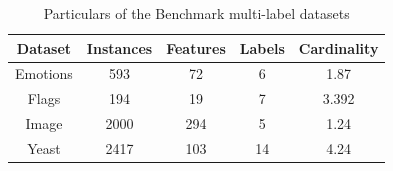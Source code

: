 \documentclass[12pt,a4paper,oneside,english]{report}
\renewcommand{\tabcolsep}{0.5cm}
\renewcommand{\arraystretch}{1.5}
\begin{document}
\begin{table}
\centering
\begin{tabular}{|c |c| c| c| c | }
   \hline
   \textbf{Dataset} & \textbf{Instances} & \textbf{Features} & \textbf{Labels} &  \textbf{Cardinality}\\
   \hline
    Emotions & 593 &72 &6 &1.87  \\
    \hline
    Flags &194 &19 &7 &3.392\\
    \hline
    Image &2000 &294 &5 &1.24\\
    \hline
    Yeast &2417 &103 &14 &4.24\\
    \hline

\end{tabular}
\caption{Particulars of the Benchmark multi-label datasets}

\label{tab:1}
\end{table}
\setlength{\tabcolsep}{2pt} %
\renewcommand{\arraystretch}{1} %
\end{document}
